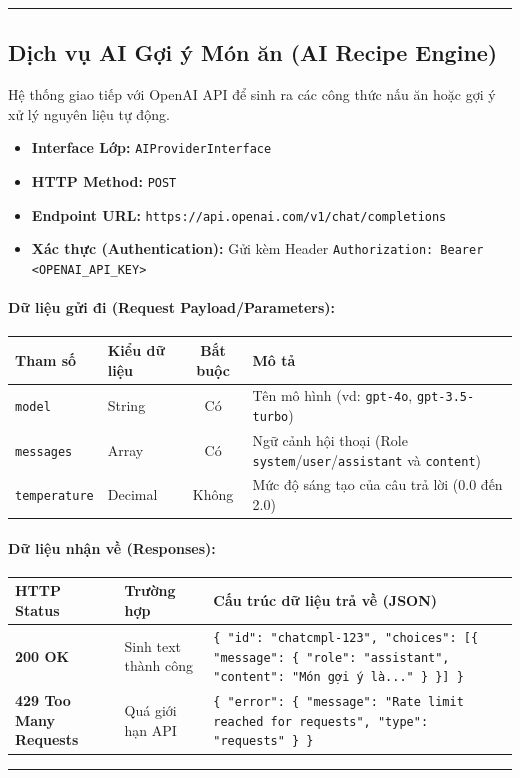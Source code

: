 \documentclass[12pt,a4paper]{article}
\begin{document}
\vskip 0.4cm
\noindent\rule{\textwidth}{0.3pt}
\vskip 0.4cm

\subsection{Dịch vụ AI Gợi ý Món ăn (AI Recipe Engine)}
Hệ thống giao tiếp với OpenAI API để sinh ra các công thức nấu ăn hoặc gợi ý xử lý nguyên liệu tự động.

\begin{itemize}[leftmargin=*]
    \item \textbf{Interface Lớp:} \texttt{AIProviderInterface}
    \item \textbf{HTTP Method:} \texttt{POST}
    \item \textbf{Endpoint URL:} \texttt{https://api.openai.com/v1/chat/completions}
    \item \textbf{Xác thực (Authentication):} Gửi kèm Header \texttt{Authorization: Bearer \textless{}OPENAI\_API\_KEY\textgreater{}}
\end{itemize}

\paragraph{Dữ liệu gửi đi (Request Payload/Parameters):}
\begin{longtable}{|p{2.8cm}|p{2.2cm}|c|p{7.0cm}|}
\hline
\textbf{Tham số} & \textbf{Kiểu dữ liệu} & \textbf{Bắt buộc} & \textbf{Mô tả} \\ \hline
\endhead
\texttt{model} & String & Có & Tên mô hình (vd: \texttt{gpt-4o}, \texttt{gpt-3.5-turbo}) \\ \hline
\texttt{messages} & Array & Có & Ngữ cảnh hội thoại (Role \texttt{system}/\texttt{user}/\texttt{assistant} và \texttt{content}) \\ \hline
\texttt{temperature} & Decimal & Không & Mức độ sáng tạo của câu trả lời (0.0 đến 2.0) \\ \hline
\end{longtable}

\paragraph{Dữ liệu nhận về (Responses):}
\begin{longtable}{|p{2.8cm}|p{3.2cm}|p{8.0cm}|}
\hline
\textbf{HTTP Status} & \textbf{Trường hợp} & \textbf{Cấu trúc dữ liệu trả về (JSON)} \\ \hline
\endhead
\textbf{200 OK} & Sinh text thành công & \texttt{\{ "id": "chatcmpl-123", "choices": [\{ "message": \{ "role": "assistant", "content": "Món gợi ý là..." \} \}] \}} \\ \hline
\textbf{429 Too Many Requests} & Quá giới hạn API & \texttt{\{ "error": \{ "message": "Rate limit reached for requests", "type": "requests" \} \}} \\ \hline
\end{longtable}

\vskip 0.4cm
\noindent\rule{\textwidth}{0.3pt}
\vskip 0.4cm
\end{document}
